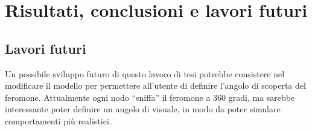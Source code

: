 \chapter{Risultati, conclusioni e lavori futuri}

\section{Lavori futuri}
Un possibile sviluppo futuro di questo lavoro di tesi potrebbe consistere nel modificare il modello per permettere all'utente di definire l'angolo di 
scoperta del feromone. Attualmente ogni nodo ``sniffa'' il feromone a 360 gradi, ma sarebbe interessante
poter definire un angolo di visuale, in modo da poter simulare comportamenti più realistici.